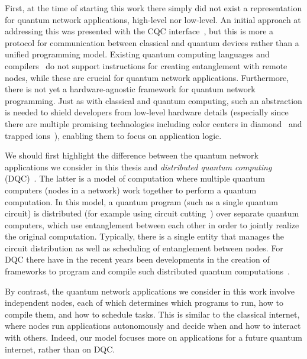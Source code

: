 First, at the time of starting this work there simply did not exist a representation for quantum network applications, high-level nor low-level.
An initial approach at addressing this was presented with the CQC interface~\cite{dahlberg2018simulaqron}, but this is more a protocol for communication between classical and quantum devices rather than a unified programming model.
Existing quantum computing languages and compilers~\cite{heim_quantum_2020, larose_overview_2019} do not support instructions for creating entanglement with remote nodes, while these are crucial for quantum network applications.
Furthermore, there is not yet a hardware-agnostic framework for quantum network programming.
Just as with classical and quantum computing, such an abstraction is needed to shield developers from low-level hardware details (especially since there are multiple promising technologies including color centers in diamond~\cite{ruf_quantum_2021} and trapped ions~\cite{monroe_quantum_2013, reiserer_cavity-based_2015}), enabling them to focus on application logic.

We should first highlight the difference between the quantum network applications we consider in this thesis and \emph{distributed quantum computing} (DQC)~\cite{caleffi_distributed_2024}.
The latter is a model of computation where multiple quantum computers (nodes in a network) work together to perform a quantum computation.
In this model, a quantum program (such as a single quantum circuit) is distributed (for example using circuit cutting~\cite{chatterjee_qurzon_2022}) over separate quantum computers, which use entanglement between each other in order to jointly realize the original computation.
Typically, there is a single entity that manages the circuit distribution as well as scheduling of entanglement between nodes.
For DQC there have in the recent years been developments in the creation of frameworks to program and compile such distributed quantum computations~\cite{chatterjee_qurzon_2022, cuomo_optimized_2023, ferrari_modular_2023}.

By contrast, the quantum network applications we consider in this work involve independent nodes, each of which determines which programs to run, how to compile them, and how to schedule tasks.
This is similar to the classical internet, where nodes run applications autonomously and decide when and how to interact with others.
Indeed, our model focuses more on applications for a future quantum internet, rather than on DQC.

